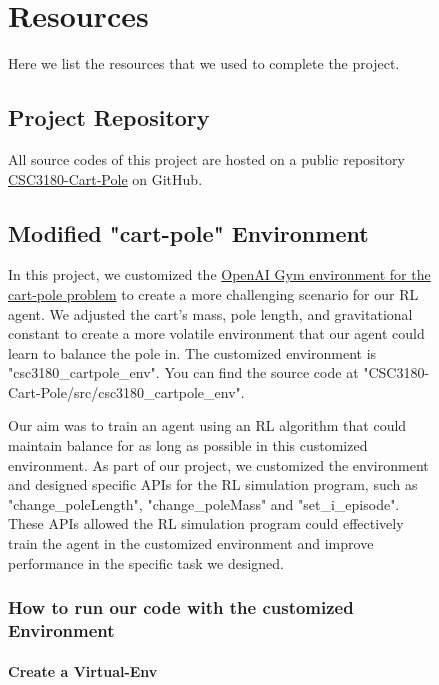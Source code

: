 \documentclass[10pt,a4paper]{article}
\begin{document}
\begin{figure}[H]
	
	
	\section{Resources}
	Here we list  the resources that we used to complete the project. 
	
	\subsection{Project Repository}
	All source codes of this project are hosted on a public repository \href{https://github.com/zixingjiang/CSC3180-Cart-Pole}{CSC3180-Cart-Pole} on GitHub. 
	
	
	\subsection{Modified "cart-pole" Environment}\label{5.2}
	In this project, we customized the \href{https://gymnasium.farama.org/environments/classic_control/cart_pole/}{OpenAI Gym environment for the cart-pole problem} to create a more challenging scenario for our RL agent. We adjusted the cart's mass, pole length, and gravitational constant to create a more volatile environment that our agent could learn to balance the pole in. The customized environment is "csc3180\_cartpole\_env". You can find the source code at "CSC3180-Cart-Pole/src/csc3180\_cartpole\_env".
	
	Our aim was to train an agent using an RL algorithm that could maintain balance for as long as possible in this customized environment. As part of our project, we customized the environment and designed specific APIs for the RL simulation program, such as "change\_poleLength", "change\_poleMass" and "set\_i\_episode". These APIs allowed the RL simulation program could effectively train the agent in the customized environment and improve performance in the specific task we designed. 
	
	\subsubsection{How to run our code with the customized Environment}
	\paragraph{Create a Virtual-Env}
	

\end{figure}
\end{document}
